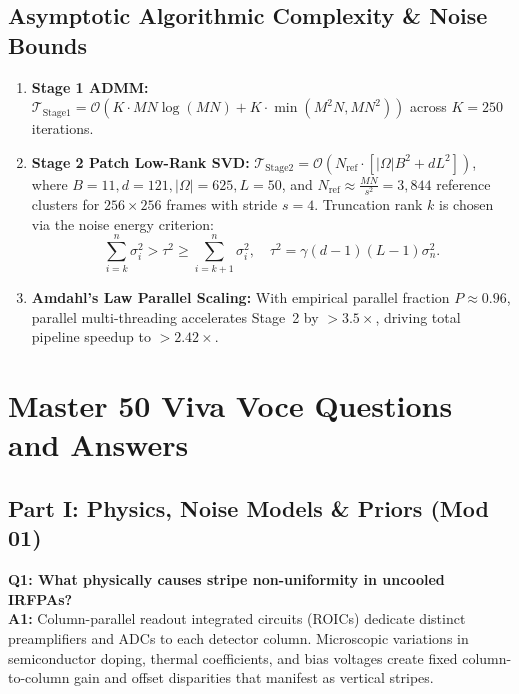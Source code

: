 \documentclass[10pt,conference]{IEEEtran}
\begin{document}
\subsection{Asymptotic Algorithmic Complexity \& Noise Bounds}
\begin{enumerate}
    \item \textbf{Stage 1 ADMM:} $\mathcal{T}_{\text{Stage1}} = \mathcal{O}(K \cdot MN \log(MN) + K \cdot \min(M^2 N, M N^2))$ across $K = 250$ iterations.
    \item \textbf{Stage 2 Patch Low-Rank SVD:} $\mathcal{T}_{\text{Stage2}} = \mathcal{O}(N_{\text{ref}} \cdot [|\Omega| B^2 + d L^2])$, where $B = 11, d = 121, |\Omega| = 625, L = 50$, and $N_{\text{ref}} \approx \frac{MN}{s^2} = 3,844$ reference clusters for $256 \times 256$ frames with stride $s = 4$. Truncation rank $k$ is chosen via the noise energy criterion:
    \begin{equation}
        \sum_{i=k}^n \sigma_i^2 > \tau^2 \ge \sum_{i=k+1}^n \sigma_i^2, \quad \tau^2 = \gamma (d-1)(L-1)\sigma_n^2.
        \label{eq:noise_energy_criterion}
    \end{equation}
    \item \textbf{Amdahl's Law Parallel Scaling:} With empirical parallel fraction $P \approx 0.96$, parallel multi-threading accelerates Stage~2 by $> 3.5\times$, driving total pipeline speedup to $> 2.42\times$.
\end{enumerate}

\section{Master 50 Viva Voce Questions and Answers}
\label{sec:50_viva_questions}

\subsection{Part I: Physics, Noise Models \& Priors (Mod 01)}

\noindent\textbf{Q1: What physically causes stripe non-uniformity in uncooled IRFPAs?}\\
\textbf{A1:} Column-parallel readout integrated circuits (ROICs) dedicate distinct preamplifiers and ADCs to each detector column. Microscopic variations in semiconductor doping, thermal coefficients, and bias voltages create fixed column-to-column gain and offset disparities that manifest as vertical stripes.
\end{document}
